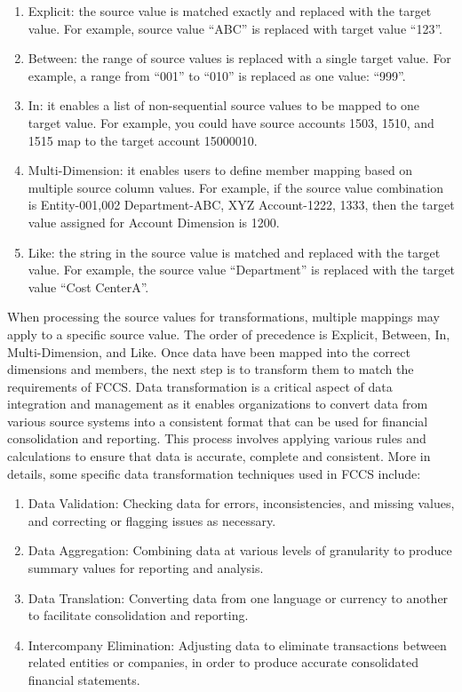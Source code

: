 \documentclass[12pt,a4paper,openright,twoside]{book}
\begin{document}
\begin{enumerate}
    \item Explicit: the source value is matched exactly and replaced with the target value. For example, source value ``ABC'' is replaced with target value ``123''.
    \item Between: the range of source values is replaced with a single target value. For example, a range from ``001'' to ``010'' is replaced as one value: ``999''. 
    \item In: it enables a list of non-sequential source values to be mapped to one target value. For example, you could have source accounts 1503, 1510, and 1515 map to the target account 15000010.
    \item Multi-Dimension: it enables users to define member mapping based on multiple source column values. For example, if the source value combination is Entity-001,002 Department-ABC, XYZ Account-1222, 1333, then the target value assigned for Account Dimension is 1200.
    \item Like: the string in the source value is matched and replaced with the target value.  For example, the source value ``Department'' is replaced with the target value ``Cost CenterA''.
\end{enumerate}

When processing the source values for transformations, multiple mappings may apply to a specific source value. 
%
The order of precedence is Explicit, Between, In, Multi-Dimension, and Like. 
%
Once data have been mapped into the correct dimensions and members, the next step is to transform them to match the requirements of FCCS. 
%
Data transformation is a critical aspect of data integration and management as it enables organizations to convert data from various source systems into a consistent format that can be used for financial consolidation and reporting.
%
This process involves applying various rules and calculations to ensure that data is accurate, complete and consistent.
%
More in details, some specific data transformation techniques used in FCCS include:

\begin{enumerate}
    \item Data Validation: Checking data for errors, inconsistencies, and missing values, and correcting or flagging issues as necessary.
    \item Data Aggregation:  Combining data at various levels of granularity to produce summary values for reporting and analysis.
    \item Data Translation: Converting data from one language or currency to another to facilitate consolidation and reporting.
    \item Intercompany Elimination: Adjusting data to eliminate transactions between related entities or companies, in order to produce accurate consolidated financial statements.
\end{enumerate}
\end{document}
